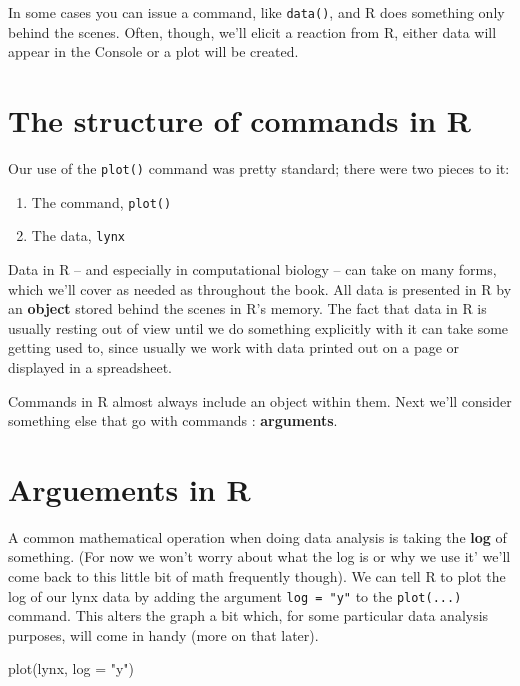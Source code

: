 \documentclass[
]{book}
\newenvironment{Shaded}{\begin{snugshade}}{\end{snugshade}}
\newcommand{\AttributeTok}[1]{\textcolor[rgb]{0.77,0.63,0.00}{#1}}
\newcommand{\FunctionTok}[1]{\textcolor[rgb]{0.00,0.00,0.00}{#1}}
\newcommand{\NormalTok}[1]{#1}
\newcommand{\StringTok}[1]{\textcolor[rgb]{0.31,0.60,0.02}{#1}}
\providecommand{\tightlist}{%
  \setlength{\itemsep}{0pt}\setlength{\parskip}{0pt}}
\begin{document}
In some cases you can issue a command, like \texttt{data()}, and R does something only behind the scenes. Often, though, we'll elicit a reaction from R, either data will appear in the Console or a plot will be created.

\hypertarget{the-structure-of-commands-in-r}{%
\section{The structure of commands in R}\label{the-structure-of-commands-in-r}}

Our use of the \texttt{plot()} command was pretty standard; there were two pieces to it:

\begin{enumerate}
\def\labelenumi{\arabic{enumi}.}
\tightlist
\item
  The command, \texttt{plot()}
\item
  The data, \texttt{lynx}
\end{enumerate}

Data in R -- and especially in computational biology -- can take on many forms, which we'll cover as needed as throughout the book. All data is presented in R by an \textbf{object} stored behind the scenes in R's memory. The fact that data in R is usually resting out of view until we do something explicitly with it can take some getting used to, since usually we work with data printed out on a page or displayed in a spreadsheet.

Commands in R almost always include an object within them. Next we'll consider something else that go with commands : \textbf{arguments}.

\hypertarget{arguements-in-r}{%
\section{Arguements in R}\label{arguements-in-r}}

A common mathematical operation when doing data analysis is taking the \textbf{log} of something. (For now we won't worry about what the log is or why we use it' we'll come back to this little bit of math frequently though). We can tell R to plot the log of our lynx data by adding the argument \texttt{log\ =\ "y"} to the \texttt{plot(...)} command. This alters the graph a bit which, for some particular data analysis purposes, will come in handy (more on that later).

\begin{Shaded}
\begin{Highlighting}[]
\FunctionTok{plot}\NormalTok{(lynx, }\AttributeTok{log =} \StringTok{"y"}\NormalTok{)}
\end{Highlighting}
\end{Shaded}
\end{document}

